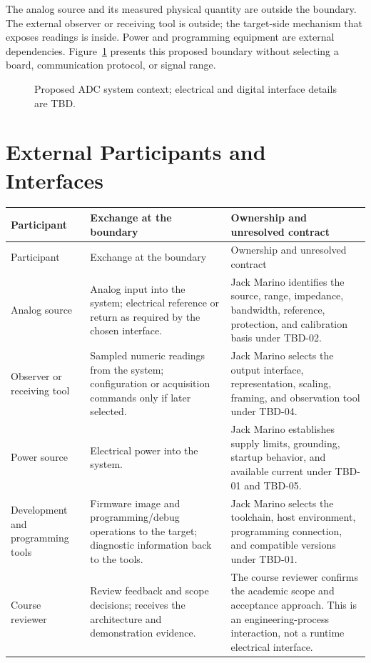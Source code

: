 The analog source and its measured physical quantity are outside the boundary.
The external observer or receiving tool is outside; the target-side mechanism
that exposes readings is inside. Power and programming equipment are external
dependencies. Figure~\ref{Figure:ADCContext} presents this proposed boundary
without selecting a board, communication protocol, or signal range.

\begin{figure}[htbp]
\centering

\caption{Proposed ADC system context; electrical and digital interface details are TBD.}
\label{Figure:ADCContext}
\end{figure}

\section{External Participants and Interfaces}
\small
\begin{tabularx}{\linewidth}{L{2.9cm}Y Y}
\caption{External Interactions\label{Table:ADCExternalInteractions}}\\
\toprule
Participant & Exchange at the boundary & Ownership and unresolved contract\\
\midrule
\endfirsthead
\toprule
Participant & Exchange at the boundary & Ownership and unresolved contract\\
\midrule
\endhead
\bottomrule
\endlastfoot
Analog source & Analog input into the system; electrical reference or return
as required by the chosen interface. &
Jack Marino identifies the source, range, impedance, bandwidth, reference,
protection, and calibration basis under TBD-02.\\
Observer or receiving tool & Sampled numeric readings from the system;
configuration or acquisition commands only if later selected. &
Jack Marino selects the output interface, representation, scaling, framing,
and observation tool under TBD-04.\\
Power source & Electrical power into the system. &
Jack Marino establishes supply limits, grounding, startup behavior, and
available current under TBD-01 and TBD-05.\\
Development and programming tools & Firmware image and programming/debug
operations to the target; diagnostic information back to the tools. &
Jack Marino selects the toolchain, host environment, programming connection,
and compatible versions under TBD-01.\\
Course reviewer & Review feedback and scope decisions; receives the
architecture and demonstration evidence. &
The course reviewer confirms the academic scope and acceptance approach.
This is an engineering-process interaction, not a runtime electrical interface.\\
\end{tabularx}
\normalsize

